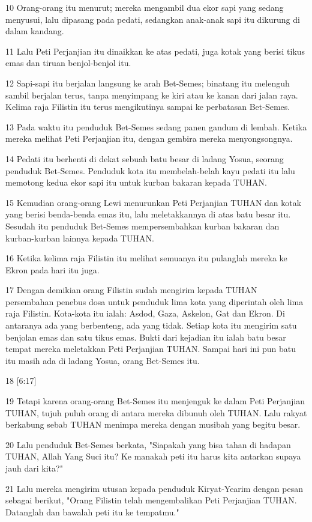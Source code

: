 \par 10 Orang-orang itu menurut; mereka mengambil dua ekor sapi yang sedang menyusui, lalu dipasang pada pedati, sedangkan anak-anak sapi itu dikurung di dalam kandang.
\par 11 Lalu Peti Perjanjian itu dinaikkan ke atas pedati, juga kotak yang berisi tikus emas dan tiruan benjol-benjol itu.
\par 12 Sapi-sapi itu berjalan langsung ke arah Bet-Semes; binatang itu melenguh sambil berjalan terus, tanpa menyimpang ke kiri atau ke kanan dari jalan raya. Kelima raja Filistin itu terus mengikutinya sampai ke perbatasan Bet-Semes.
\par 13 Pada waktu itu penduduk Bet-Semes sedang panen gandum di lembah. Ketika mereka melihat Peti Perjanjian itu, dengan gembira mereka menyongsongnya.
\par 14 Pedati itu berhenti di dekat sebuah batu besar di ladang Yosua, seorang penduduk Bet-Semes. Penduduk kota itu membelah-belah kayu pedati itu lalu memotong kedua ekor sapi itu untuk kurban bakaran kepada TUHAN.
\par 15 Kemudian orang-orang Lewi menurunkan Peti Perjanjian TUHAN dan kotak yang berisi benda-benda emas itu, lalu meletakkannya di atas batu besar itu. Sesudah itu penduduk Bet-Semes mempersembahkan kurban bakaran dan kurban-kurban lainnya kepada TUHAN.
\par 16 Ketika kelima raja Filistin itu melihat semuanya itu pulanglah mereka ke Ekron pada hari itu juga.
\par 17 Dengan demikian orang Filistin sudah mengirim kepada TUHAN persembahan penebus dosa untuk penduduk lima kota yang diperintah oleh lima raja Filistin. Kota-kota itu ialah: Asdod, Gaza, Askelon, Gat dan Ekron. Di antaranya ada yang berbenteng, ada yang tidak. Setiap kota itu mengirim satu benjolan emas dan satu tikus emas. Bukti dari kejadian itu ialah batu besar tempat mereka meletakkan Peti Perjanjian TUHAN. Sampai hari ini pun batu itu masih ada di ladang Yosua, orang Bet-Semes itu.
\par 18 [6:17]
\par 19 Tetapi karena orang-orang Bet-Semes itu menjenguk ke dalam Peti Perjanjian TUHAN, tujuh puluh orang di antara mereka dibunuh oleh TUHAN. Lalu rakyat berkabung sebab TUHAN menimpa mereka dengan musibah yang begitu besar.
\par 20 Lalu penduduk Bet-Semes berkata, "Siapakah yang bisa tahan di hadapan TUHAN, Allah Yang Suci itu? Ke manakah peti itu harus kita antarkan supaya jauh dari kita?"
\par 21 Lalu mereka mengirim utusan kepada penduduk Kiryat-Yearim dengan pesan sebagai berikut, "Orang Filistin telah mengembalikan Peti Perjanjian TUHAN. Datanglah dan bawalah peti itu ke tempatmu."

